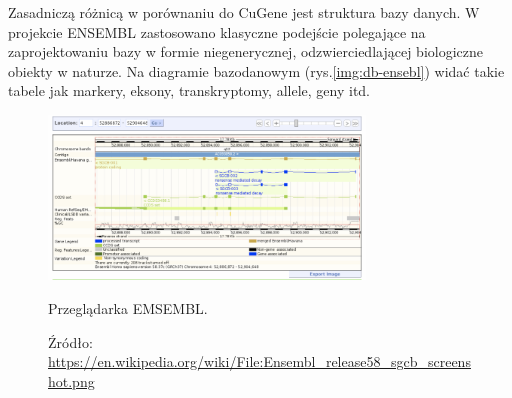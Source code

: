 \begin{itemize}
	Zasadniczą różnicą w porównaniu do CuGene jest struktura bazy danych. W projekcie ENSEMBL zastosowano klasyczne podejście polegające na zaprojektowaniu bazy w formie niegenerycznej, odzwierciedlającej biologiczne obiekty w naturze. Na diagramie bazodanowym (rys.\ref{img:db-ensebl}) widać takie tabele jak markery, eksony, transkryptomy, allele, geny itd.
	
	\begin{figure}[h]
		\centering
		\includegraphics[width=0.75\textwidth]{img/browser-ensembl.png}
		\caption{Przeglądarka EMSEMBL.}
		\vspace{-0.5cm}
		\caption*{\scriptsize Źródło: \url{https://en.wikipedia.org/wiki/File:Ensembl\_release58\_sgcb\_screenshot.png}}
		\label{img:przegladarka-ensembl}
	\end{figure}
	\begin{figure}[h]
		\centering

\end{figure}
\end{itemize}
